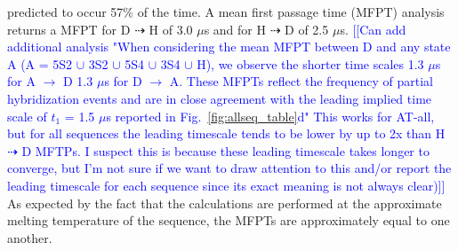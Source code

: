 \documentclass[journal=jpcbfk,manuscript=article]{achemso}
\newcommand*{\noteb}[1]{\textcolor{blue}{[[#1]]}}		%
\begin{document}
predicted to occur 57\% of the time. A mean first passage time (MFPT) analysis returns a MFPT for D $\dashrightarrow$ H of 3.0 $\mu$s and for H $\dashrightarrow$ D of 2.5 $\mu$s. \noteb{Can add additional analysis "When considering the mean MFPT between D and any state A (A = 5S2 $\cup$ 3S2 $\cup$ 5S4 $\cup$ 3S4 $\cup$ H), we observe the shorter time scales 1.3 $\mu$s for A $\rightarrow$ D 1.3 $\mu$s for D $\rightarrow$ A. These MFPTs reflect the frequency of partial hybridization events and are in close agreement with the leading implied time scale of $t_1$ = 1.5 $\mu$s reported in Fig.~\ref{fig:allseq_table}d" This works for AT-all, but for all sequences the leading timescale tends to be lower by up to 2x than H $\dashrightarrow$ D MFTPs. I suspect this is because these leading timescale takes longer to converge, but I'm not sure if we want to draw attention to this and/or report the leading timescale for each sequence since its exact meaning is not always clear)} As expected by the fact that the calculations are performed at the approximate melting temperature of the sequence, the MFPTs are approximately equal to one another.  



\end{document}
